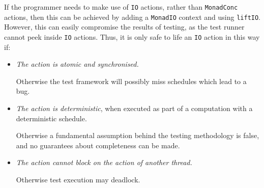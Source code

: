 If the programmer needs to make use of \verb|IO| actions, rather than
\verb|MonadConc| actions, then this can be achieved by adding a
\verb|MonadIO| context and using \verb|liftIO|. However, this can
easily compromise the results of testing, as the test runner cannot
peek inside \verb|IO| actions. Thus, it is only safe to life an
\verb|IO| action in this way if:

\begin{itemize}
\item \emph{The action is atomic and synchronised.}

  Otherwise the test framework will possibly miss schedules which lead
  to a bug.

\item \emph{The action is deterministic}, when executed as part of a
  computation with a deterministic schedule.

  Otherwise a fundamental assumption behind the testing methodology
  is false, and no guarantees about completeness can be made.

\item \emph{The action cannot block on the action of another thread.}

  Otherwise test execution may deadlock.
\end{itemize}
